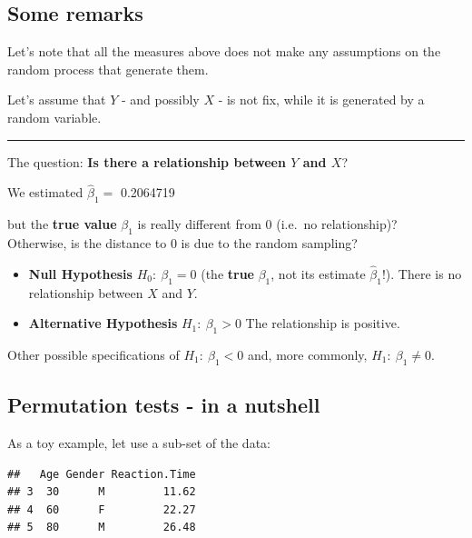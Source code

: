 \documentclass[]{article}
\begin{document}
\hypertarget{some-remarks}{%
\subsection{Some remarks}\label{some-remarks}}

Let's note that all the measures above does not make any assumptions on
the random process that generate them.

Let's assume that \(Y\) - and possibly \(X\) - is not fix, while it is
generated by a random variable.

\begin{center}\rule{0.5\linewidth}{\linethickness}\end{center}

The question: \textbf{Is there a relationship between \(Y\) and \(X\)}?

We estimated \(\hat{\beta}_1=\) 0.2064719

but the \textbf{true value} \(\beta_1\) is really different from 0
(i.e.~no relationship)?\\
Otherwise, is the distance to 0 is due to the random sampling?

\begin{itemize}
\item
  \textbf{Null Hypothesis} \(H_0: \ \beta_1=0\) (the \textbf{true}
  \(\beta_1\), not its estimate \(\hat{\beta}_1\)!). There is no
  relationship between \(X\) and \(Y\).
\item
  \textbf{Alternative Hypothesis }\(H_1: \ \beta_1 >0\) The relationship
  is positive.
\end{itemize}

Other possible specifications of \(H_1: \ \beta_1< 0\) and, more
commonly, \(H_1: \ \beta_1 \neq 0\).

\hypertarget{permutation-tests---in-a-nutshell}{%
\subsection{Permutation tests - in a
nutshell}\label{permutation-tests---in-a-nutshell}}

As a toy example, let use a sub-set of the data:

\begin{verbatim}
##   Age Gender Reaction.Time
## 3  30      M         11.62
## 4  60      F         22.27
## 5  80      M         26.48
\end{verbatim}
\end{document}
